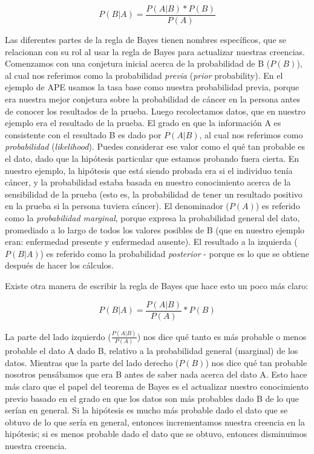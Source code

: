 \documentclass[
  12pt,
]{book}
\begin{document}
\[
P(B|A) =  \frac{P(A|B)*P(B)}{P(A)}
\]

Las diferentes partes de la regla de Bayes tienen nombres específicos, que se relacionan con su rol al usar la regla de Bayes para actualizar nuestras creencias. Comenzamos con una conjetura inicial acerca de la probabilidad de B (\(P(B)\)), al cual nos referimos como la probabilidad \emph{previa} (\emph{prior} probability). En el ejemplo de APE usamos la tasa base como nuestra probabilidad previa, porque era nuestra mejor conjetura sobre la probabilidad de cáncer en la persona antes de conocer los resultados de la prueba. Luego recolectamos datos, que en nuestro ejemplo era el resultado de la prueba. El grado en que la información A es consistente con el resultado B es dado por \(P(A|B)\), al cual nos referimos como \emph{probabilidad} (\emph{likelihood}). Puedes considerar ese valor como el qué tan probable es el dato, dado que la hipótesis particular que estamos probando fuera cierta. En nuestro ejemplo, la hipótesis que está siendo probada era si el individuo tenía cáncer, y la probabilidad estaba basada en nuestro conocimiento acerca de la sensibilidad de la prueba (esto es, la probabilidad de tener un resultado positivo en la prueba si la persona tuviera cáncer). El denominador (\(P(A)\)) es referido como la \emph{probabilidad marginal}, porque expresa la probabilidad general del dato, promediado a lo largo de todos los valores posibles de B (que en nuestro ejemplo eran: enfermedad presente y enfermedad ausente).
El resultado a la izquierda (\(P(B|A)\)) es referido como la probabilidad \emph{posterior} - porque es lo que se obtiene después de hacer los cálculos.

Existe otra manera de escribir la regla de Bayes que hace esto un poco más claro:

\[
P(B|A) = \frac{P(A|B)}{P(A)}*P(B)
\]

La parte del lado izquierdo (\(\frac{P(A|B)}{P(A)}\)) nos dice qué tanto es más probable o menos probable el dato A dado B, relativo a la probabilidad general (marginal) de los datos. Mientras que la parte del lado derecho (\(P(B)\)) nos dice qué tan probable nosotros pensábamos que era B antes de saber nada acerca del dato A. Esto hace más claro que el papel del teorema de Bayes es el actualizar nuestro conocimiento previo basado en el grado en que los datos son más probables dado B de lo que serían en general. Si la hipótesis es mucho más probable dado el dato que se obtuvo de lo que sería en general, entonces incrementamos nuestra creencia en la hipótesis; si es menos probable dado el dato que se obtuvo, entonces disminuimos nuestra creencia.
\end{document}
